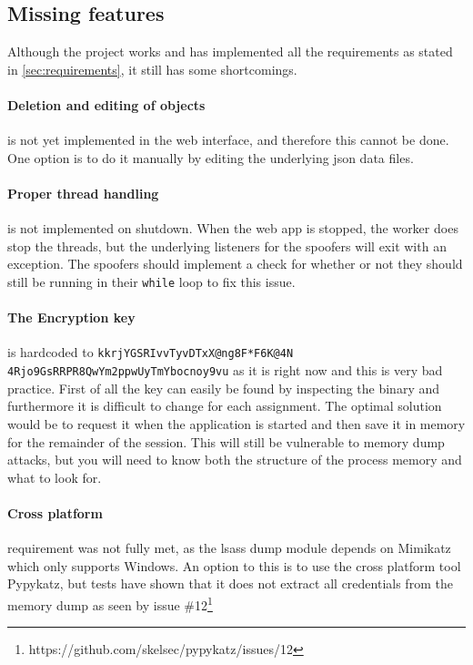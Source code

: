\documentclass{article}
\begin{document}
\subsection{Missing features}
Although the project works and has implemented all the requirements as stated in \ref{sec:requirements}, it still has some shortcomings.

\paragraph{Deletion and editing of objects} is not yet implemented in the web interface, and therefore this cannot be done. One option is to do it manually by editing the underlying \gls{json} data files.

\paragraph{Proper thread handling} is not implemented on shutdown. When the web app is stopped, the worker does stop the threads, but the underlying listeners for the spoofers will exit with an exception. The spoofers should implement a check for whether or not they should still be running in their \texttt{while} loop to fix this issue.

\paragraph{The Encryption key} is hardcoded to \texttt{kkrjYGSRIvvTyvDTxX@ng8F*F6K@4N 4Rjo9GsRRPR8QwYm2ppwUyTmYbocnoy9vu} as it is right now and this is very bad practice. First of all the key can easily be found by inspecting the binary and furthermore it is difficult to change for each assignment. The optimal solution would be to request it when the application is started and then save it in memory for the remainder of the session. This will still be vulnerable to memory dump attacks, but you will need to know both the structure of the process memory and what to look for.

\paragraph{Cross platform} requirement was not fully met, as the \gls{lsass} dump module depends on Mimikatz which only supports Windows. An option to this is to use the cross platform tool Pypykatz\cite{url:discussion:pypykatz}, but tests have shown that it does not extract all credentials from the memory dump as seen by issue \#12\footnote{https://github.com/skelsec/pypykatz/issues/12}
\end{document}
